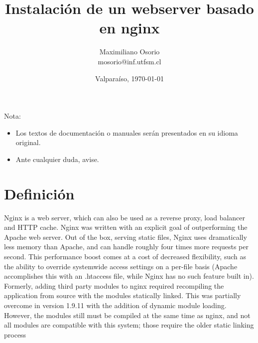 \documentclass[11pt]{exam}
\title{Instalación de un webserver basado en nginx} \author{Maximiliano Osorio \\ mosorio@inf.utfsm.cl}
\date{Valparaíso, \today}
\begin{document}
\maketitle
{}
\vspace{5mm}

Nota:
\begin{itemize}
	\item Los textos de documentación o manuales serán presentados en su idioma original.
	\item Ante cualquier duda, avise.
\end{itemize}

\section{Definición}

Nginx is a web server, which can also be used as a reverse proxy, load balancer and HTTP cache.
Nginx was written with an explicit goal of outperforming the Apache web server. Out of the box, serving static files, Nginx uses dramatically less memory than Apache, and can handle roughly four times more requests per second. This performance boost comes at a cost of decreased flexibility, such as the ability to override systemwide access settings on a per-file basis (Apache accomplishes this with an .htaccess file, while Nginx has no such feature built in). Formerly, adding third party modules to nginx required recompiling the application from source with the modules statically linked. This was partially overcome in version 1.9.11 with the addition of dynamic module loading. However, the modules still must be compiled at the same time as nginx, and not all modules are compatible with this system; those require the older static linking process
\end{document}
